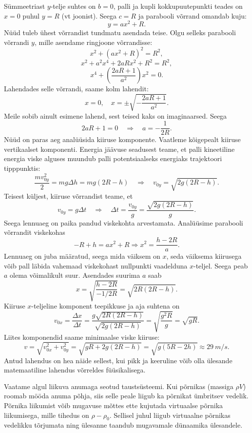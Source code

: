 \documentclass[10pt]{article}
\begin{document}
{Sümmeetriast $y$-telje suhtes on $b = 0$, palli ja kupli kokkupuutepunkti teades on $x = 0$ puhul $y = R$ (vt joonist). Seega $c = R$ ja parabooli võrrand omandab kuju:
\[
y = ax^2 + R.
\]
Nüüd tuleb ühest võrrandist tundmatu asendada teise. Olgu selleks parabooli võrrandi $y$, mille asendame ringjoone võrrandisse:
\[
x^{2}+\left(a x^{2}+R\right)^{2}=R^{2},
\]
\[
x^{2}+a^{2} x^{4}+2 a R x^{2}+R^{2}=R^{2},
\]
\[
x^{4}+\left(\frac{2 a R+1}{a^{2}}\right) x^{2}=0.
\]
Lahendades selle võrrandi, saame kolm lahendit:
\[
x=0, \quad x=\pm \sqrt{-\frac{2 a R+1}{a^{2}}}.
\]
Meile sobib ainult esimene lahend, sest teised kaks on imaginaarsed. Seega
\[
2aR + 1 = 0 \quad\Rightarrow\quad a = - \frac{1}{2R}.
\]
Nüüd on paras aeg analüüsida kiiruse komponente. Vaatleme kõigepealt kiiruse vertikaalset komponenti. Energia jäävuse seadusest teame, et palli kineetiline energia viske alguses muundub palli potentsiaalseks energiaks trajektoori tipppunktis:
\[
\frac{m v_{0 y}^{2}}{2}=m g \Delta h=m g(2 R-h) \quad\Rightarrow\quad v_{0 y}=\sqrt{2 g(2 R-h)}.
\]
Teisest küljest, kiiruse võrrandist teame, et
\[
v_{0 y}=g \Delta t \quad \Rightarrow \quad \Delta t=\frac{v_{0 y}}{g}=\frac{\sqrt{2 g(2 R-h)}}{g}.
\]
Seega lennuaeg on paika pandud viskekohta arvestamata. Analüüsime parabooli võrrandit viskekohas
\[
-R + h = ax^2 + R \Rightarrow x^2 = \frac{h-2R}{a}.
\]
Lennuaeg on juba määratud, seega mida väiksem on $x$, seda väiksema kiirusega võib pall läbida vahemaad viskekohast nullpunkti vaadelduna $x$-teljel. Seega peab $a$ olema võimalikult suur. Asendades suurima $a$ saab
\[
x=\sqrt{\frac{h-2 R}{-1 / 2 R}}=\sqrt{2 R(2 R-h)}.
\]
Kiiruse $x$-teljeline komponent teepikkuse ja aja suhtena on
\[
v_{0 x}=\frac{\Delta x}{\Delta t}=\frac{g \sqrt{2 R(2 R-h)}}{\sqrt{2 g(2 R-h)}}=\sqrt{\frac{g^{2} R}{g}}=\sqrt{g R}.
\]
Liites komponendid saame minimaalse viske kiiruse:
\[
v=\sqrt{v_{0 x}^{2}+v_{0 y}^{2}}=\sqrt{g R+2 g(2 R-h)}=\sqrt{g(5 R-2 h)} \approx \SI{29}{m/s}.
\]
Antud lahendus on hea näide sellest, kui pikk ja keeruline võib olla ülesande matemaatiline lahendus võrreldes füüsikalisega.
\probend
\bigskip


\solu
Vaatame algul liikuva anumaga seotud taustsüsteemi. Kui põrnikas (massiga $\rho V$) roomab mööda anuma põhja, siis selle peale liigub ka põrnikat ümbritsev vedelik. Põrnika liikumist võib mugavuse mõttes ette kujutada virtuaalse põrnika liikumisega, mille tihedus on $\rho - \rho_0$. Sellisel juhul liigub virtuaalne põrnikas vedelikku tõrjumata ning ülesanne taandub mugavamale dünaamika ülesandele.

}
\end{document}
